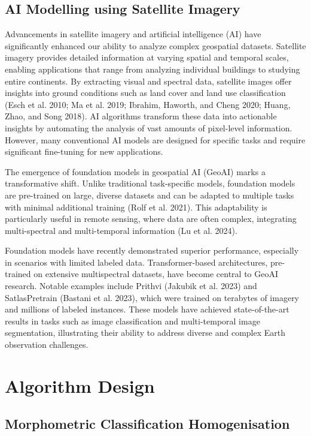 \documentclass[
  letterpaper,
  DIV=11,
  numbers=noendperiod]{scrartcl}
\begin{document}
\subsection{AI Modelling using Satellite
Imagery}\label{ai-modelling-using-satellite-imagery}

Advancements in satellite imagery and artificial intelligence (AI) have
significantly enhanced our ability to analyze complex geospatial
datasets. Satellite imagery provides detailed information at varying
spatial and temporal scales, enabling applications that range from
analyzing individual buildings to studying entire continents. By
extracting visual and spectral data, satellite images offer insights
into ground conditions such as land cover and land use classification
(Esch et al. 2010; Ma et al. 2019; Ibrahim, Haworth, and Cheng 2020;
Huang, Zhao, and Song 2018). AI algorithms transform these data into
actionable insights by automating the analysis of vast amounts of
pixel-level information. However, many conventional AI models are
designed for specific tasks and require significant fine-tuning for new
applications.

The emergence of foundation models in geospatial AI (GeoAI) marks a
transformative shift. Unlike traditional task-specific models,
foundation models are pre-trained on large, diverse datasets and can be
adapted to multiple tasks with minimal additional training (Rolf et al.
2021). This adaptability is particularly useful in remote sensing, where
data are often complex, integrating multi-spectral and multi-temporal
information (Lu et al. 2024).

Foundation models have recently demonstrated superior performance,
especially in scenarios with limited labeled data. Transformer-based
architectures, pre-trained on extensive multispectral datasets, have
become central to GeoAI research. Notable examples include Prithvi
(Jakubik et al. 2023) and SatlasPretrain (Bastani et al. 2023), which
were trained on terabytes of imagery and millions of labeled instances.
These models have achieved state-of-the-art results in tasks such as
image classification and multi-temporal image segmentation, illustrating
their ability to address diverse and complex Earth observation
challenges.

\section{Algorithm Design}\label{algorithm-design}

\subsection{Morphometric Classification
Homogenisation}\label{morphometric-classification-homogenisation-1}
\end{document}
